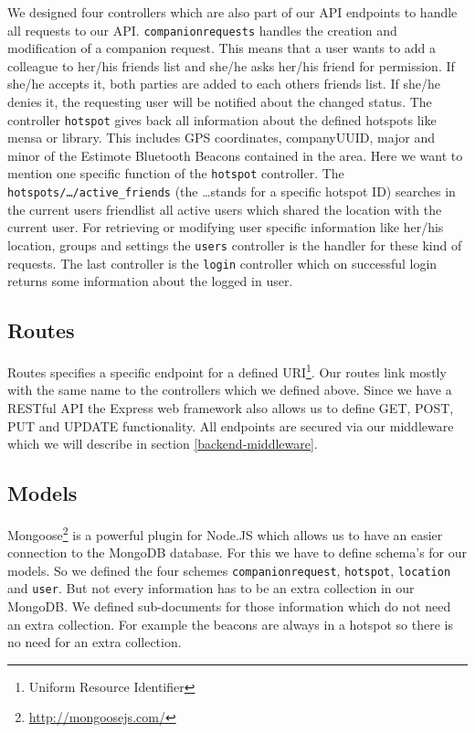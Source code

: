 We designed four controllers which are also part of our API endpoints to handle all requests to our API. \texttt{companionrequests} handles the creation and modification of a companion request. This means that a user wants to add a colleague to her/his friends list and she/he asks her/his friend for permission. If she/he accepts it, both parties are added to each others friends list. If she/he denies it, the requesting user will be notified about the changed status. The controller \texttt{hotspot} gives back all information about the defined hotspots like mensa or library. This includes GPS coordinates, companyUUID, major and minor of the Estimote Bluetooth Beacons contained in the area. Here we want to mention one specific function of the \texttt{hotspot} controller. The \texttt{hotspots/\ldots/active\_friends} (the \ldots stands for a specific hotspot ID) searches in the current users friendlist all active users which shared the location with the current user. For retrieving or modifying user specific information like her/his location, groups and settings the \texttt{users} controller is the handler for these kind of requests. The last controller is the \texttt{login} controller which on successful login returns some information about the logged in user.

\subsection{Routes}

Routes specifies a specific endpoint for a defined URI\footnote{Uniform Resource Identifier}. Our routes link mostly with the same name to the controllers which we defined above. Since we have a RESTful API the Express web framework also allows us to define GET, POST, PUT and UPDATE functionality. All endpoints are secured via our middleware which we will describe in section \ref{backend-middleware}.

\subsection{Models}
\label{mongoDB-models}

Mongoose\footnote{\url{http://mongoosejs.com/}} is a powerful plugin for Node.JS which allows us to have an easier connection to the MongoDB database. For this we have to define schema's for our models. So we defined the four schemes \texttt{companionrequest}, \texttt{hotspot}, \texttt{location} and \texttt{user}. But not every information has to be an extra collection in our MongoDB. We defined sub-documents for those information which do not need an extra collection. For example the beacons are always in a hotspot so there is no need for an extra collection.

